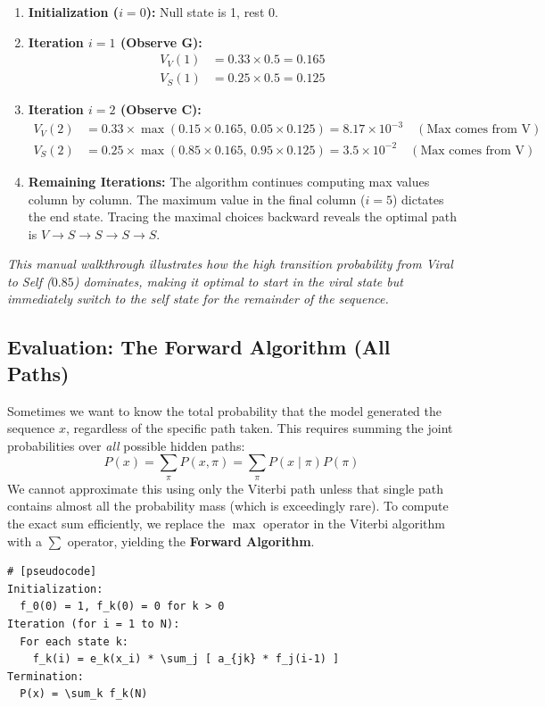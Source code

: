 \begin{enumerate}
    \item \textbf{Initialization ($i=0$):} Null state is 1, rest 0.
    \item \textbf{Iteration $i=1$ (Observe G):}
    \begin{align*}
        V_V(1) &= 0.33 \times 0.5 = 0.165 \\
        V_S(1) &= 0.25 \times 0.5 = 0.125
    \end{align*}
    \item \textbf{Iteration $i=2$ (Observe C):}
    \begin{align*}
        V_V(2) &= 0.33 \times \max(0.15 \times 0.165, \, 0.05 \times 0.125) = 8.17 \times 10^{-3} \quad (\text{Max comes from V})\\
        V_S(2) &= 0.25 \times \max(0.85 \times 0.165, \, 0.95 \times 0.125) = 3.5 \times 10^{-2} \quad (\text{Max comes from V})
    \end{align*}
    \item \textbf{Remaining Iterations:} The algorithm continues computing max values column by column. The maximum value in the final column ($i=5$) dictates the end state. Tracing the maximal choices backward reveals the optimal path is $V \rightarrow S \rightarrow S \rightarrow S \rightarrow S$.
\end{enumerate}
\textit{This manual walkthrough illustrates how the high transition probability from Viral to Self ($0.85$) dominates, making it optimal to start in the viral state but immediately switch to the self state for the remainder of the sequence.}

\subsection{Evaluation: The Forward Algorithm (All Paths)}

Sometimes we want to know the total probability that the model generated the sequence $x$, regardless of the specific path taken. This requires summing the joint probabilities over \textit{all} possible hidden paths:
\[
  P(x) = \sum_{\pi} P(x, \pi) = \sum_{\pi} P(x \mid \pi) P(\pi)
\]
We cannot approximate this using only the Viterbi path unless that single path contains almost all the probability mass (which is exceedingly rare). To compute the exact sum efficiently, we replace the $\max$ operator in the Viterbi algorithm with a $\sum$ operator, yielding the \textbf{Forward Algorithm}.

\begin{verbatim}
# [pseudocode]
Initialization:
  f_0(0) = 1, f_k(0) = 0 for k > 0
Iteration (for i = 1 to N):
  For each state k:
    f_k(i) = e_k(x_i) * \sum_j [ a_{jk} * f_j(i-1) ]
Termination:
  P(x) = \sum_k f_k(N)
\end{verbatim}

